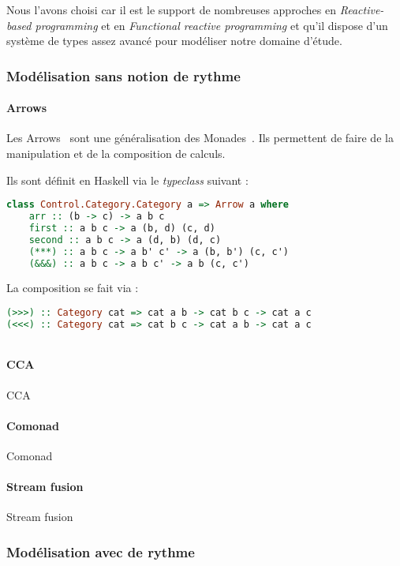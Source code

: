 \documentclass{llncs}
\newcommand{\RP}{\emph{Reactive-based programming} }
\newcommand{\FRP}{\emph{Functional reactive programming} }
\begin{document}
Nous l'avons choisi car il est le support de nombreuses approches en \RP
et en \FRP et qu'il dispose d'un système de types assez avancé pour modéliser
notre domaine d'étude.

\subsubsection{Modélisation sans notion de rythme}
\paragraph{Arrows}
Les Arrows~\cite{Hughes00} sont une généralisation des Monades~\cite{Wadler90}.
Ils permettent de faire de la manipulation et de la composition de calculs.

Ils sont définit en Haskell via le \emph{typeclass} suivant :
\begin{lstlisting}[language=haskell]
class Control.Category.Category a => Arrow a where
    arr :: (b -> c) -> a b c
    first :: a b c -> a (b, d) (c, d)
    second :: a b c -> a (d, b) (d, c)
    (***) :: a b c -> a b' c' -> a (b, b') (c, c')
    (&&&) :: a b c -> a b c' -> a b (c, c')
\end{lstlisting}

La composition se fait via :
\begin{lstlisting}[language=haskell]
(>>>) :: Category cat => cat a b -> cat b c -> cat a c
(<<<) :: Category cat => cat b c -> cat a b -> cat a c
\end{lstlisting}

\begin{lstlisting}[language=haskell]
\end{lstlisting}

\paragraph{CCA}
CCA~\cite{CCA-JFP}
\paragraph{Comonad}
Comonad~\cite{Brookes91}~\cite{Coutts07}
\paragraph{Stream fusion}
Stream fusion~\cite{Yi05}

\subsubsection{Modélisation avec de rythme}
\end{document}
